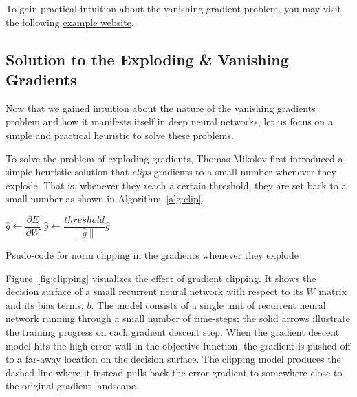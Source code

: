 \documentclass{tufte-handout}
\begin{document}
To gain practical intuition about the vanishing gradient problem, you may visit the following \uline{\href{http://cs224d.stanford.edu/notebooks/vanishing_grad_example.html}{example website}}.

\subsection{Solution to the Exploding \& Vanishing Gradients}
Now that we gained intuition about the nature of the vanishing gradients problem and how it manifests itself in deep neural networks, let us focus on a simple and practical heuristic to solve these problems. 

To solve the problem of exploding gradients, Thomas Mikolov first introduced a simple heuristic solution that \textit{clips} gradients to a small number whenever they explode. That is, whenever they reach a certain threshold, they are set back to a small number as shown in Algorithm~\ref{alg:clip}.

\begin{algorithm}
\begin{algorithmic}
\State $\hat{g} \gets \dfrac{\partial E}{\partial W}$
    \State $\hat{g} \gets \dfrac{threshold}{\parallel \hat{g} \parallel} \hat{g}$
\EndIf
\end{algorithmic}
\caption{Psudo-code for norm clipping in the gradients whenever they explode}
\label{alg:clip}
\end{algorithm}

Figure~\ref{fig:clipping} visualizes the effect of gradient clipping. It shows the decision surface of a small recurrent neural network with respect to its $W$ matrix and its bias terms, $b$. The model consists of a single unit of recurrent neural network running through a small number of time-steps; the solid arrows illustrate the training progress on each gradient descent step. When the gradient descent model hits the high error wall in the objective function, the gradient is pushed off to a far-away location on the decision surface. The clipping model produces the dashed line where it instead pulls back the error gradient to somewhere close to the original gradient landscape.
\end{document}
